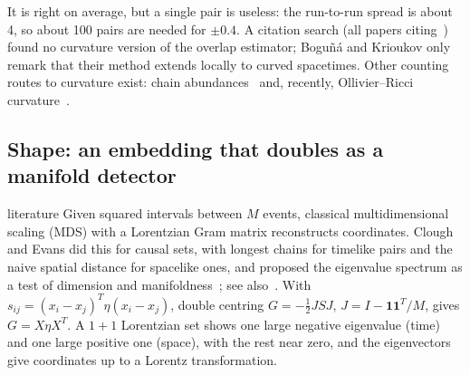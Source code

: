 \documentclass[11pt,a4paper]{article}
\newcommand{\tagbox}[2]{\textsf{\scriptsize\colorbox{#1!12}{\textcolor{#1!70!black}{#2}}}}
\newcommand{\lit}{\tagbox{blue}{literature}}
\begin{document}
It is right on average, but a single pair is useless: the run-to-run spread is about 4, so about 100 pairs are needed for $\pm0.4$. A citation search (all papers citing~\cite{BK24}) found no curvature version of the overlap estimator; Bogu\~n\'a and Krioukov only remark that their method extends locally to curved spacetimes. Other counting routes to curvature exist: chain abundances~\cite{RSS13} and, recently, Ollivier--Ricci curvature~\cite{BBR26}.

\subsection{Shape: an embedding that doubles as a manifold detector}
\lit{} Given squared intervals between $M$ events, classical multidimensional scaling (MDS) with a Lorentzian Gram matrix reconstructs coordinates. Clough and Evans did this for causal sets, with longest chains for timelike pairs and the naive spatial distance for spacelike ones, and proposed the eigenvalue spectrum as a test of dimension and manifoldness~\cite{CloughEvans16}; see also~\cite{Henson06,Johnston25}. With $s_{ij}=(x_i-x_j)^T\eta(x_i-x_j)$, double centring $G=-\tfrac12JSJ$, $J=I-\mathbf 1\mathbf 1^T/M$, gives $G=X\eta X^T$. A $1+1$ Lorentzian set shows one large negative eigenvalue (time) and one large positive one (space), with the rest near zero, and the eigenvectors give coordinates up to a Lorentz transformation.
\end{document}
